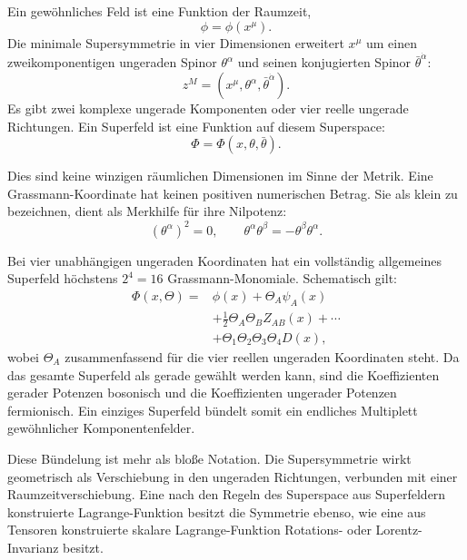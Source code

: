 Ein gewöhnliches Feld ist eine Funktion der Raumzeit,
\begin{equation}
\phi=\phi(x^\mu).
\end{equation}
Die minimale Supersymmetrie in vier Dimensionen erweitert \(x^\mu\) um einen zweikomponentigen ungeraden Spinor \(\theta^\alpha\) und seinen konjugierten Spinor \(\bar\theta^{\dot\alpha}\):
\begin{equation}
z^M=(x^\mu,\theta^\alpha,\bar\theta^{\dot\alpha}).
\end{equation}
Es gibt zwei komplexe ungerade Komponenten oder vier reelle ungerade Richtungen. Ein Superfeld ist eine Funktion auf diesem Superspace:
\begin{equation}
\Phi=\Phi(x,\theta,\bar\theta).
\end{equation}

Dies sind keine winzigen räumlichen Dimensionen im Sinne der Metrik. Eine Grassmann-Koordinate hat keinen positiven numerischen Betrag. Sie als klein zu bezeichnen, dient als Merkhilfe für ihre Nilpotenz:
\begin{equation}
(\theta^\alpha)^2=0,
\qquad
\theta^\alpha\theta^\beta=-\theta^\beta\theta^\alpha.
\end{equation}

Bei vier unabhängigen ungeraden Koordinaten hat ein vollständig allgemeines Superfeld höchstens \(2^4=16\) Grassmann-Monomiale. Schematisch gilt:
\begin{equation}
\begin{aligned}
\Phi(x,\Theta)={}&\phi(x)+\Theta_A\psi_A(x)\\
&+\frac{1}{2}\Theta_A\Theta_B Z_{AB}(x)+\cdots\\
&+\Theta_1\Theta_2\Theta_3\Theta_4D(x),
\end{aligned}
\end{equation}
wobei \(\Theta_A\) zusammenfassend für die vier reellen ungeraden Koordinaten steht. Da das gesamte Superfeld als gerade gewählt werden kann, sind die Koeffizienten gerader Potenzen bosonisch und die Koeffizienten ungerader Potenzen fermionisch. Ein einziges Superfeld bündelt somit ein endliches Multiplett gewöhnlicher Komponentenfelder.

Diese Bündelung ist mehr als bloße Notation. Die Supersymmetrie wirkt geometrisch als Verschiebung in den ungeraden Richtungen, verbunden mit einer Raumzeitverschiebung. Eine nach den Regeln des Superspace aus Superfeldern konstruierte Lagrange-Funktion besitzt die Symmetrie ebenso, wie eine aus Tensoren konstruierte skalare Lagrange-Funktion Rotations- oder Lorentz-Invarianz besitzt.

